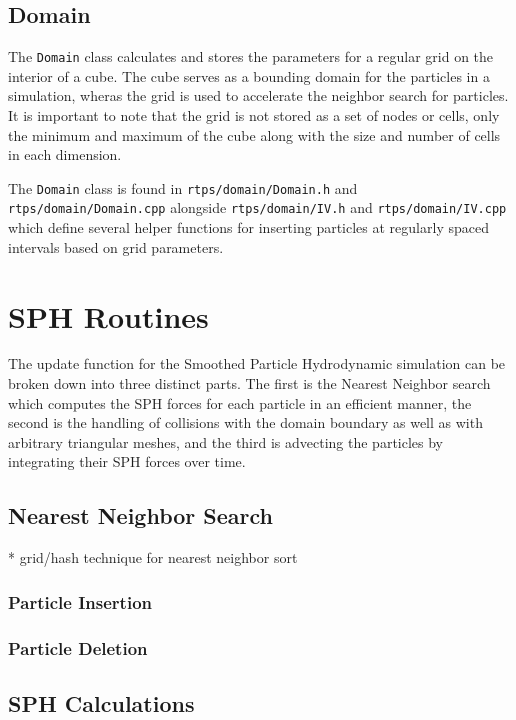 \subsection{Domain}

The \verb|Domain| class calculates and stores the parameters for a regular grid
on the interior of a cube. The cube serves as a bounding domain for the
particles in a simulation, wheras the grid is used to accelerate the neighbor
search for particles. It is important to note that the grid is not stored as a
set of nodes or cells, only the minimum and maximum of the cube along with the
size and number of cells in each dimension.

The \verb|Domain| class is found in \verb|rtps/domain/Domain.h| and
\verb|rtps/domain/Domain.cpp| alongside \verb|rtps/domain/IV.h| and
\verb|rtps/domain/IV.cpp| which define several helper functions for inserting
particles at regularly spaced intervals based on grid parameters.



\section{SPH Routines}

The update function for the Smoothed Particle Hydrodynamic simulation can be
broken down into three distinct parts. The first is the Nearest Neighbor search
which computes the SPH forces for each particle in an efficient manner, the
second is the handling of collisions with the domain boundary as well as with
arbitrary triangular meshes, and the third is advecting the particles by
integrating their SPH forces over time. 

\subsection{Nearest Neighbor Search}
* grid/hash technique for nearest neighbor sort



\subsubsection{Particle Insertion}
\subsubsection{Particle Deletion}

\subsection{SPH Calculations}

